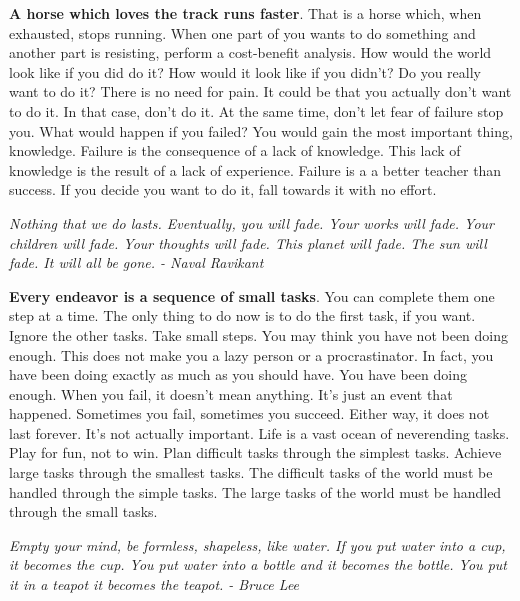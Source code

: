 \documentclass[a4paper,hidelinks]{article}
\begin{document}
\textbf{A horse which loves the track runs faster}.
That is a horse which, when exhausted, stops running.
When one part of you wants to do something and another part is resisting, perform a cost-benefit analysis.
How would the world look like if you did do it?
How would it look like if you didn't?
Do you really want to do it?
There is no need for pain.
It could be that you actually don't want to do it.
In that case, don't do it.
At the same time, don't let fear of failure stop you.
What would happen if you failed?
You would gain the most important thing, knowledge.
Failure is the consequence of a lack of knowledge.
This lack of knowledge is the result of a lack of experience.
Failure is a a better teacher than success.
If you decide you want to do it, fall towards it with no effort.

\newpage

\begin{center}
\textit{Nothing that we do lasts. Eventually, you will fade. Your works will fade. Your children will fade. Your thoughts will fade. This planet will fade. The sun will fade. It will all be gone. - Naval Ravikant}
\end{center}

\textbf{Every endeavor is a sequence of small tasks}.
You can complete them one step at a time.
The only thing to do now is to do the first task, if you want.
Ignore the other tasks.
Take small steps.
You may think you have not been doing enough.
This does not make you a lazy person or a procrastinator.
In fact, you have been doing exactly as much as you should have.
You have been doing enough.
When you fail, it doesn't mean anything.
It's just an event that happened.
Sometimes you fail, sometimes you succeed.
Either way, it does not last forever.
It's not actually important.
Life is a vast ocean of neverending tasks.
Play for fun, not to win.
Plan difficult tasks through the simplest tasks.
Achieve large tasks through the smallest tasks.
The difficult tasks of the world must be handled through the simple tasks.
The large tasks of the world must be handled through the small tasks.

\newpage

\begin{center}
\textit{Empty your mind, be formless, shapeless, like water. If you put water into a cup, it becomes the cup. You put water into a bottle and it becomes the bottle. You put it in a teapot it becomes the teapot. - Bruce Lee}
\end{center}
\end{document}

